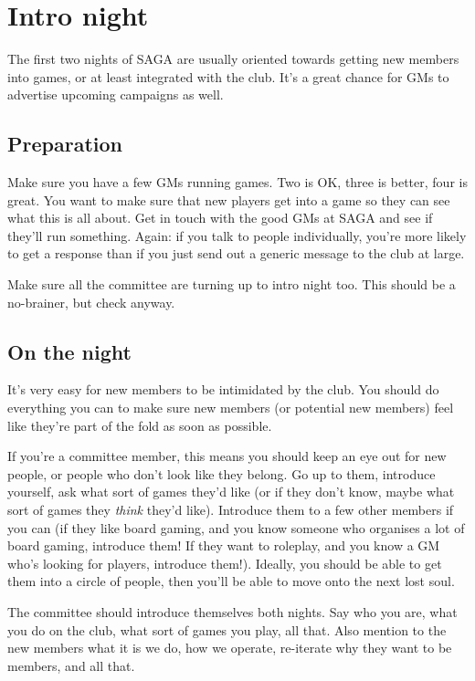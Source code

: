 \section{Intro night}

The first two nights of SAGA are usually oriented towards getting new members into games, or at least integrated with the club. It's a great chance for GMs to advertise upcoming campaigns as well.

\subsection{Preparation}

Make sure you have a few GMs running games. Two is OK, three is better, four is great. You want to make sure that new players get into a game so they can see what this is all about. Get in touch with the good GMs at SAGA and see if they'll run something. Again: if you talk to people individually, you're more likely to get a response than if you just send out a generic message to the club at large.

Make sure all the committee are turning up to intro night too. This should be a no-brainer, but check anyway.

\subsection{On the night}

It's very easy for new members to be intimidated by the club. You should do everything you can to make sure new members (or potential new members) feel like they're part of the fold as soon as possible.

If you're a committee member, this means you should keep an eye out for new people, or people who don't look like they belong. Go up to them, introduce yourself, ask what sort of games they'd like (or if they don't know, maybe what sort of games they \textit{think} they'd like). Introduce them to a few other members if you can (if they like board gaming, and you know someone who organises a lot of board gaming, introduce them! If they want to roleplay, and you know a GM who's looking for players, introduce them!). Ideally, you should be able to get them into a circle of people, then you'll be able to move onto the next lost soul.

The committee should introduce themselves both nights. Say who you are, what you do on the club, what sort of games you play, all that. Also mention to the new members what it is we do, how we operate, re-iterate why they want to be members, and all that.

